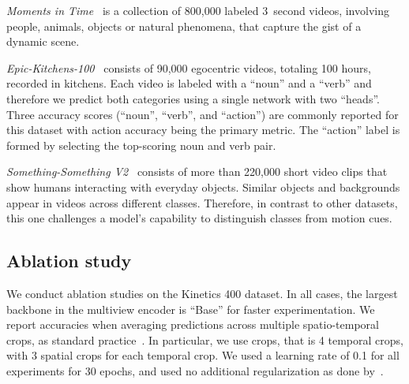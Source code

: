 \emph{Moments in Time}~\cite{monfort_pami_2019} is a collection of 800,000 labeled 3~second videos, involving people, animals, objects or natural phenomena, that capture the gist of a dynamic scene.

\emph{Epic-Kitchens-100}~\cite{damen2021rescaling} consists of 90,000 egocentric videos, totaling 100 hours, recorded in kitchens. Each video is labeled with a ``noun'' and a ``verb'' and therefore we predict both categories using a single network with two ``heads''. Three accuracy scores (``noun'', ``verb'', and ``action'') are commonly reported for this dataset with action accuracy being the primary metric. The “action” label is formed by selecting the top-scoring noun and verb pair. 

\emph{Something-Something V2}~\cite{goyal_iccv_2017} consists of more than 220,000 short video clips that show humans interacting with everyday objects. Similar objects and backgrounds appear in videos across different classes. Therefore, in contrast to other datasets, this one challenges a model’s capability to distinguish classes from motion cues. 


\subsection{Ablation study} \label{sec:ablations}

We conduct ablation studies on the Kinetics 400 dataset.
In all cases, the largest backbone in the multiview encoder is ``Base'' for faster experimentation.
We report accuracies when averaging predictions across multiple spatio-temporal crops, as standard practice~\cite{arnab2021vivit, bertasius_arxiv_2021, feichtenhofer_iccv_2019,Carreira_2017_CVPR}.
In particular, we use  crops, that is 4 temporal crops, with 3 spatial crops for each temporal crop.
We used a learning rate of 0.1 for all experiments for 30 epochs, and used no additional regularization as done by~\cite{arnab2021vivit}.


